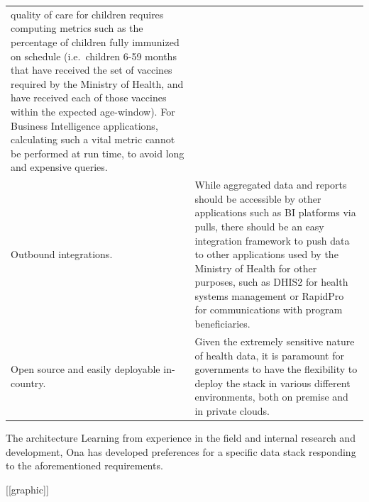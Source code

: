 \documentclass[
  authoryear]{elsarticle}
\begin{document}
\begin{longtable}[]{@{}
  >{\raggedright\arraybackslash}p{}
  >{\raggedright\arraybackslash}p{}@{}}
quality of care for children requires computing metrics such as the
percentage of children fully immunized on schedule (i.e.~children 6-59
months that have received the set of vaccines required by the Ministry
of Health, and have received each of those vaccines within the expected
age-window). For Business Intelligence applications, calculating such a
vital metric cannot be performed at run time, to avoid long and
expensive queries. \\
Outbound integrations. & While aggregated data and reports should be
accessible by other applications such as BI platforms via pulls, there
should be an easy integration framework to push data to other
applications used by the Ministry of Health for other purposes, such as
DHIS2 for health systems management or RapidPro for communications with
program beneficiaries. \\
Open source and easily deployable in-country. & Given the extremely
sensitive nature of health data, it is paramount for governments to have
the flexibility to deploy the stack in various different environments,
both on premise and in private clouds. \\
\end{longtable}

The architecture Learning from experience in the field and internal
research and development, Ona has developed preferences for a specific
data stack responding to the aforementioned requirements.

{[}{[}graphic{]}{]}
\end{document}
